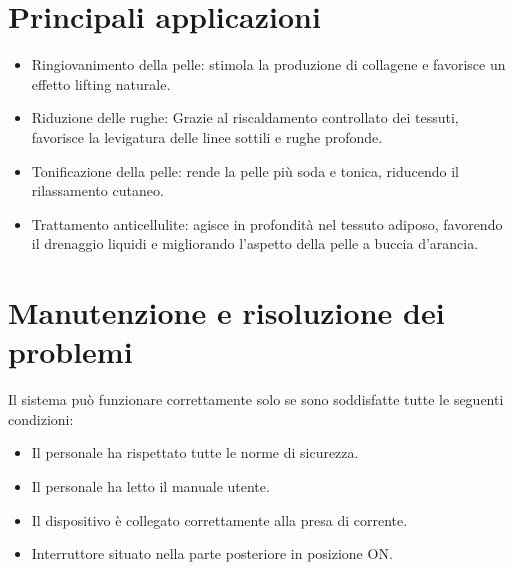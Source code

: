 \documentclass[a4paper]{article}
\begin{document}
\section{Principali applicazioni}
\begin{itemize}
  \item Ringiovanimento della pelle: stimola la produzione di collagene e favorisce un effetto lifting naturale.
  \item Riduzione delle rughe: Grazie al riscaldamento controllato dei tessuti, favorisce la levigatura delle linee sottili e rughe profonde.
  \item Tonificazione della pelle: rende la pelle più soda e tonica, riducendo il rilassamento cutaneo.
  \item Trattamento anticellulite: agisce in profondità nel tessuto adiposo, favorendo il drenaggio liquidi e migliorando l'aspetto della pelle a buccia d'arancia.
\end{itemize}

\section{Manutenzione e risoluzione dei problemi}
Il sistema può funzionare correttamente solo se sono soddisfatte tutte le seguenti condizioni:

\begin{itemize}
  \item Il personale ha rispettato tutte le norme di sicurezza.
  \item Il personale ha letto il manuale utente.
  \item Il dispositivo è collegato correttamente alla presa di corrente.
  \item Interruttore situato nella parte posteriore in posizione ON.
\end{itemize}
\end{document}
